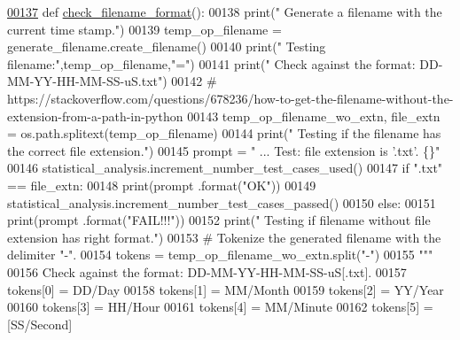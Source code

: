 \begin{DoxyCode}
\hypertarget{classutilities_1_1generate__results__filename__tester_1_1generate__filename__tester_l00137}{}\hyperlink{classutilities_1_1generate__results__filename__tester_1_1generate__filename__tester_a4b73142b6465894e81a1393e829abee2}{00137}     \textcolor{keyword}{def }\hyperlink{classutilities_1_1generate__results__filename__tester_1_1generate__filename__tester_a4b73142b6465894e81a1393e829abee2}{check\_filename\_format}():
00138         print(\textcolor{stringliteral}{" Generate a filename with the current time stamp."})
00139         temp\_op\_filename = generate\_filename.create\_filename()
00140         print(\textcolor{stringliteral}{" Testing filename:"},temp\_op\_filename,\textcolor{stringliteral}{"="})
00141         print(\textcolor{stringliteral}{" Check against the format: DD-MM-YY-HH-MM-SS-uS.txt"})
00142         \textcolor{comment}{#
       https://stackoverflow.com/questions/678236/how-to-get-the-filename-without-the-extension-from-a-path-in-python}
00143         temp\_op\_filename\_wo\_extn, file\_extn = os.path.splitext(temp\_op\_filename)
00144         print(\textcolor{stringliteral}{" Testing if the filename has the correct file extension."})
00145         prompt = \textcolor{stringliteral}{"  ... Test: file extension is '.txt'.         \{\}"}
00146         statistical\_analysis.increment\_number\_test\_cases\_used()
00147         \textcolor{keywordflow}{if} \textcolor{stringliteral}{".txt"} == file\_extn:
00148             print(prompt .format(\textcolor{stringliteral}{"OK"}))
00149             statistical\_analysis.increment\_number\_test\_cases\_passed()
00150         \textcolor{keywordflow}{else}:
00151             print(prompt .format(\textcolor{stringliteral}{"FAIL!!!"}))
00152         print(\textcolor{stringliteral}{" Testing if filename without file extension has right format."})
00153         \textcolor{comment}{# Tokenize the generated filename with the delimiter "-".}
00154         tokens = temp\_op\_filename\_wo\_extn.split(\textcolor{stringliteral}{"-"})
00155         \textcolor{stringliteral}{"""}
00156 \textcolor{stringliteral}{            Check against the format: DD-MM-YY-HH-MM-SS-uS[.txt].}
00157 \textcolor{stringliteral}{            tokens[0] = DD/Day}
00158 \textcolor{stringliteral}{            tokens[1] = MM/Month}
00159 \textcolor{stringliteral}{            tokens[2] = YY/Year}
00160 \textcolor{stringliteral}{            tokens[3] = HH/Hour}
00161 \textcolor{stringliteral}{            tokens[4] = MM/Minute}
00162 \textcolor{stringliteral}{            tokens[5] = [SS/Second]}

\end{DoxyCode}
